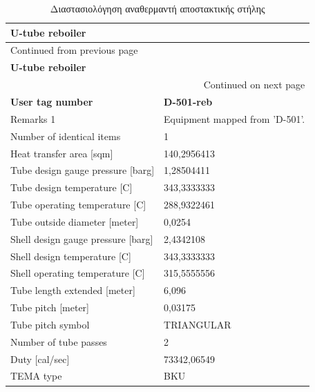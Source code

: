 \documentclass[11pt]{article}
\begin{document}
\begin{longtable}{ll}
\caption{Διαστασιολόγηση αναθερμαντή αποστακτικής στήλης}
\\
\textbf{U-tube reboiler} & \\
\hline
\endfirsthead
\multicolumn{2}{l}{Continued from previous page} \\
\hline

\textbf{U-tube reboiler} &  \\

\hline
\endhead
\hline\multicolumn{2}{r}{Continued on next page} \\
\endfoot
\endlastfoot
\hline
\textbf{User tag number} & \textbf{D-501-reb}\\
Remarks 1 & Equipment mapped from 'D-501'.\\
Number of identical items & 1\\
Heat transfer area [sqm] & 140,2956413\\
Tube design gauge pressure [barg] & 1,28504411\\
Tube design temperature [C] & 343,3333333\\
Tube operating temperature [C] & 288,9322461\\
Tube outside diameter [meter] & 0,0254\\
Shell design gauge pressure [barg] & 2,4342108\\
Shell design temperature [C] & 343,3333333\\
Shell operating temperature [C] & 315,5555556\\
Tube length extended [meter] & 6,096\\
Tube pitch [meter] & 0,03175\\
Tube pitch symbol & TRIANGULAR\\
Number of tube passes & 2\\
Duty [cal/sec] & 73342,06549\\
TEMA type & BKU\\
\end{longtable}
\end{document}
